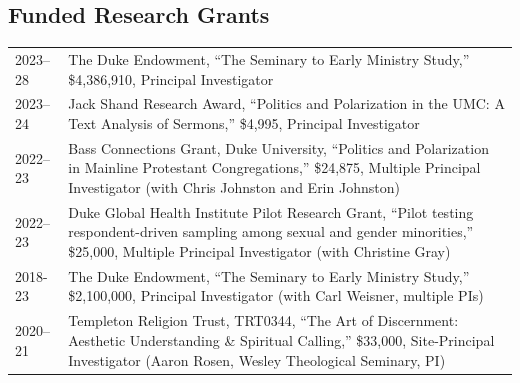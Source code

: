 \subsection*{Funded Research Grants}
\begin{longtable}{p{} p{}}
2023--28 & The Duke Endowment, ``The Seminary to Early Ministry Study,'' \$4,386,910, Principal Investigator\\

2023--24 & Jack Shand Research Award, ``Politics and Polarization in the UMC: A Text Analysis of Sermons,'' \$4,995, Principal Investigator\\

2022--23 & Bass Connections Grant, Duke University, ``Politics and Polarization in Mainline Protestant Congregations,'' \$24,875, Multiple Principal Investigator (with Chris Johnston and Erin Johnston)\\

2022--23 & Duke Global Health Institute Pilot Research Grant, ``Pilot testing respondent-driven sampling among sexual and gender minorities,'' \$25,000, Multiple Principal Investigator (with Christine Gray)\\

2018-23 & The Duke Endowment, ``The Seminary to Early Ministry Study,'' \$2,100,000, Principal Investigator (with Carl Weisner, multiple PIs)\\
%

2020--21 & Templeton Religion Trust, TRT0344, ``The Art of Discernment: Aesthetic Understanding \& Spiritual Calling,'' \$33,000, Site-Principal Investigator (Aaron Rosen, Wesley Theological Seminary, PI)\\



\end{longtable}
